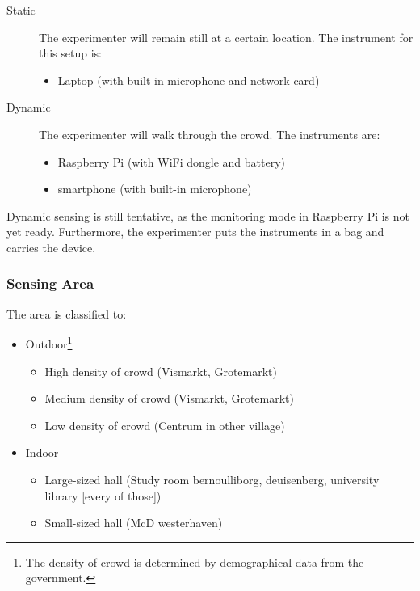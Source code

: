 \documentclass{article}
\begin{document}
\label{ssub:sensing_setup}
\begin{description}
	\item[Static] The experimenter will remain still at a certain location. The instrument for this setup is:
	\begin{itemize}
		\item Laptop (with built-in microphone and network card)
	\end{itemize}

	\item[Dynamic] The experimenter will walk through the crowd. The instruments are:
	\begin{itemize}
		\item Raspberry Pi (with WiFi dongle and battery)
		\item smartphone (with built-in microphone)
	\end{itemize}
\end{description}

Dynamic sensing is still tentative, as the monitoring mode in Raspberry Pi is not yet ready. Furthermore, the experimenter puts the instruments in a bag and carries the device.

\subsubsection*{Sensing Area} %
\label{ssub:sensing_area}
The area is classified to:
\begin{itemize}
	\item Outdoor\footnote{The density of crowd is determined by demographical data from the government.}
	\begin{itemize}
		\item High density of crowd (Vismarkt, Grotemarkt)
		\item Medium density of crowd (Vismarkt, Grotemarkt)
		\item Low density of crowd (Centrum in other village)
	\end{itemize}
	
	\item Indoor
	\begin{itemize}
		\item Large-sized hall (Study room bernoulliborg, deuisenberg, university library [every of those])
		\item Small-sized hall (McD westerhaven)
	\end{itemize}
\end{itemize}
\end{document}
